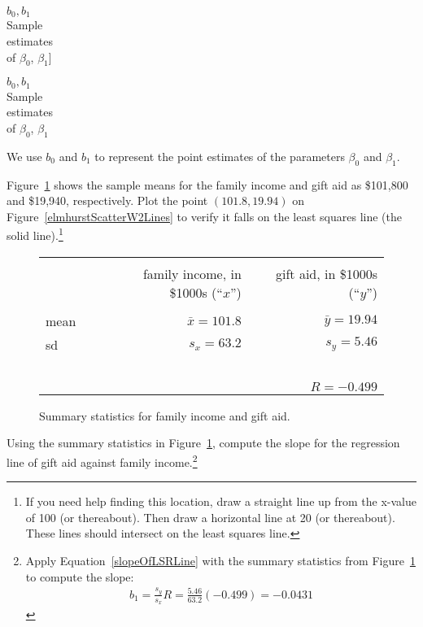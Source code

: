 $b_0, b_1$\vspace{0.5mm}\\\footnotesize Sample\\estimates\\ of $\beta_0$, $\beta_1$]{\raggedright\vspace{0.5mm}

$b_0, b_1$\vspace{0.5mm}\\\footnotesize Sample\\estimates\\ of $\beta_0$, $\beta_1$}We use $b_0$ and $b_1$ to represent the point estimates of the parameters $\beta_0$ and $\beta_1$.

\begin{exercise}
Figure~\ref{summaryStatsOfSATGPAData} shows the sample means for the family income and gift aid as \$101,800 and \$19,940, respectively. Plot the point $(101.8, 19.94)$ on Figure~\vref{elmhurstScatterW2Lines} to verify it falls on the least squares line (the solid line).\footnote{If you need help finding this location, draw a straight line up from the x-value of 100 (or thereabout). Then draw a horizontal line at 20 (or thereabout). These lines should intersect on the least squares line.}
\end{exercise}

\begin{figure}[ht]
\centering
\begin{tabular}{l rr}
\hline
\vspace{-4mm} & & \\
\vspace{0.4mm}	&	\ \ family income, in \$1000s (``$x$'')	& \ \ gift aid, in \$1000s (``$y$'') \\
\hline
  \vspace{-3.9mm} & & \\
mean	& $\bar{x} = 101.8$		& $\bar{y} = 19.94$ \\
sd		& $s_x = 63.2$		& $s_y = 5.46$\vspace{0.4mm} \\
\hline
\vspace{-4mm}\ &\\
	& \multicolumn{2}{r}{$R=-0.499$} \\
\hline
\end{tabular}
\caption{Summary statistics for family income and gift aid.}
\label{summaryStatsOfSATGPAData}
\end{figure}

\begin{exercise} \label{findingTheSlopeOfTheLSRLineForIncomeAndAid}
Using the summary statistics in Figure~\ref{summaryStatsOfSATGPAData}, compute the slope for the regression line of gift aid against family income.\footnote{Apply Equation~\eqref{slopeOfLSRLine} with the summary statistics from Figure~\ref{summaryStatsOfSATGPAData} to compute the slope:
\begin{eqnarray*}
b_1 = \frac{s_y}{s_x} R = \frac{5.46}{63.2}(-0.499) = -0.0431
\end{eqnarray*}\vspace{-3mm}}
\end{exercise}

